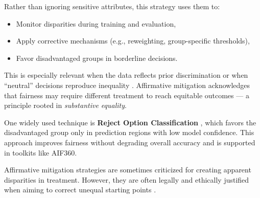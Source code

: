 Rather than ignoring sensitive attributes, this strategy uses them to:

\begin{itemize}
    \item Monitor disparities during training and evaluation,
    \item Apply corrective mechanisms (e.g., reweighting, group-specific thresholds),
    \item Favor disadvantaged groups in borderline decisions.
\end{itemize}

This is especially relevant when the data reflects prior discrimination or when “neutral” decisions reproduce inequality \cite{barocas2016big}. Affirmative mitigation acknowledges that fairness may require different treatment to reach equitable outcomes — a principle rooted in \textit{substantive equality}.

One widely used technique is \textbf{Reject Option Classification} \cite{kamiran2012data}, which favors the disadvantaged group only in prediction regions with low model confidence. This approach improves fairness without degrading overall accuracy and is supported in toolkits like AIF360.

Affirmative mitigation strategies are sometimes criticized for creating apparent disparities in treatment. However, they are often legally and ethically justified when aiming to correct unequal starting points \cite{corbett2018measure}.
